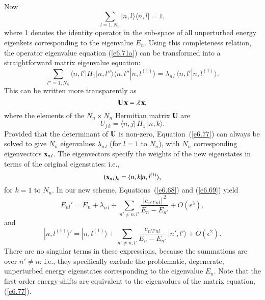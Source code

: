 Now 
\begin{equation}
\sum_{l=1,N_n} |n,l\rangle \langle n,l| = 1,
\end{equation}
where 1 denotes the identity operator in the sub-space of all unperturbed
energy eigenkets corresponding to the eigenvalue $E_n$. Using this completeness
relation, the operator eigenvalue equation (\ref{e6.71a}) can be transformed into a 
straightforward matrix eigenvalue equation:
\begin{equation}
\sum_{l''=1,N_n}\langle n, l'|H_1|n, l''\rangle \langle n, l''|n, l^{(1)}\rangle
= \lambda_{n\,l}\, \langle n, l'| n, l^{(1)}\rangle. 
\end{equation}
This can be written more transparently as
\begin{equation}\label{e6.77}
{\bf U} \,{\bf x} = \lambda \,{\bf x},
\end{equation}
where the elements of the $N_n\times N_n$  Hermitian matrix ${\bf U}$ are
\begin{equation}\label{e6.78}
U_{j\,k} = \langle n, j|\, H_1\,| n, k\rangle.
\end{equation}
Provided that the determinant of ${\bf U}$ is non-zero, Equation~(\ref{e6.77})  can always be solved to
give $N_n$ eigenvalues $\lambda_{n\,l}$ (for $l=1$ to $N_n$), with
$N_n$ corresponding eigenvectors ${\bf x}_{n\,l}$. The eigenvectors specify the
weights of the new eigenstates in terms of the original eigenstates: {\rm i.e.},
\begin{equation}
({\bf x}_{n\,l})_k = \langle n, k|n, l^{(1)}\rangle,
\end{equation}
for $k=1$ to $N_n$. In our new scheme, Equations~(\ref{e6.68}) and (\ref{e6.69}) yield
\begin{equation}
E_{nl}' = E_n + \lambda_{n\,l} + \sum_{n'\neq n, l'}
\frac{|e_{n'l'nl}|^{\,2}}{E_n - E_{n'}} + O(\epsilon^3),
\end{equation}
and
\begin{equation}
|n, l^{(1)}\rangle' = |n,l^{(1)}\rangle + \sum_{n'\neq n, l'}
\frac{e_{n'l'nl}}{E_n-E_{n'}}\,|n',l'\rangle + O(\epsilon^2).
\end{equation}
There are no singular terms in these expressions, because the summations
are over $n'\neq n$: {\rm i.e.}, they specifically exclude
the problematic, 
degenerate, unperturbed energy eigenstates corresponding to the eigenvalue $E_n$. 
Note that the first-order energy-shifts are equivalent to the eigenvalues
of the matrix equation, (\ref{e6.77}).

